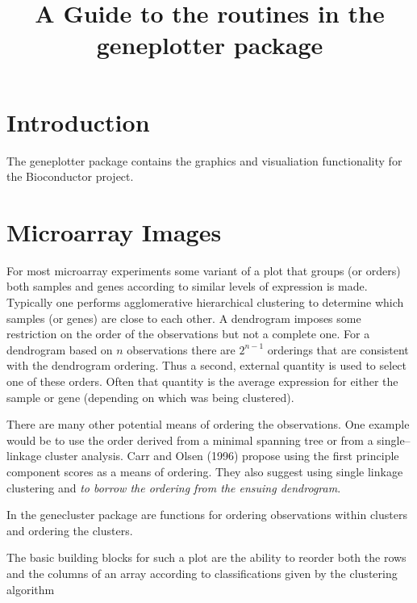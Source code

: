 \documentclass{article}
\begin{document}
\title{A Guide to the routines in the geneplotter package}
\maketitle

\section{Introduction}

The geneplotter package contains the graphics and visualiation
functionality for the Bioconductor project. 


\section{Microarray Images}

For most microarray experiments some variant of a plot that groups (or
orders) both samples and genes according to similar levels of
expression is made.
Typically one performs agglomerative hierarchical clustering to
determine which samples (or genes) are close to each other.
A dendrogram imposes some restriction on the order of the observations
but not a complete one. For a dendrogram based on $n$ observations
there are $2^{n-1}$ orderings that are consistent with the dendrogram
ordering. Thus a second, external quantity is used to select one of
these orders. Often that quantity is the average expression for either
the sample or gene (depending on which was being clustered).

There are many other potential means of ordering the observations.
One example would be to use the order derived from a minimal spanning
tree or from a single--linkage cluster analysis.
Carr and Olsen (1996) propose using the first principle component
scores as a means of ordering. They also suggest using single linkage
clustering and {\em to borrow the ordering from the ensuing
  dendrogram}.


In the genecluster package are functions for ordering observations
within clusters and ordering the clusters.


The basic building blocks for such a plot are the ability to reorder
both the rows and the columns of an array according to classifications
given by the clustering algorithm
\end{document}
